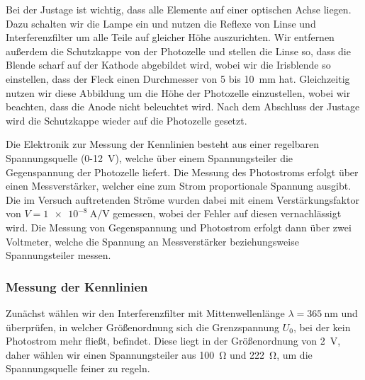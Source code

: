 \documentclass[11pt, a4paper]{article}
\numberwithin{equation}{section}
\begin{document}
Bei der Justage ist wichtig, dass alle Elemente auf einer optischen Achse liegen.
Dazu schalten wir die Lampe ein und nutzen die Reflexe von Linse und Interferenzfilter um alle Teile auf gleicher Höhe auszurichten.
Wir entfernen außerdem die Schutzkappe von der Photozelle und stellen die Linse so, dass die Blende scharf auf der Kathode abgebildet wird, wobei wir die Irisblende so einstellen, dass der Fleck einen Durchmesser von \num{5} bis \SI{10}{\milli\metre} hat.
Gleichzeitig nutzen wir diese Abbildung um die Höhe der Photozelle einzustellen, wobei wir beachten, dass die Anode nicht beleuchtet wird.
Nach dem Abschluss der Justage wird die Schutzkappe wieder auf die Photozelle gesetzt.

Die Elektronik zur Messung der Kennlinien besteht aus einer regelbaren Spannungsquelle (\num{0}-\SI{12}{\volt}), welche über einem Spannungsteiler die Gegenspannung der Photozelle liefert.
Die Messung des Photostroms erfolgt über einen Messverstärker, welcher eine zum Strom proportionale Spannung ausgibt.
Die im Versuch auftretenden Ströme wurden dabei mit einem Verstärkungsfaktor von $V = \SI{1e-8}{\ampere\per\volt}$ gemessen, wobei der Fehler auf diesen vernachlässigt wird.
Die Messung von Gegenspannung und Photostrom erfolgt dann über zwei Voltmeter, welche die Spannung an Messverstärker beziehungsweise Spannungsteiler messen.

\subsubsection{Messung der Kennlinien}
Zunächst wählen wir den Interferenzfilter mit Mittenwellenlänge $\lambda = \SI{365}{\nano\metre}$ und überprüfen, in welcher Größenordnung sich die Grenzspannung $U_0$, bei der kein Photostrom mehr fließt, befindet.
Diese liegt in der Größenordnung von \SI{2}{\volt}, daher wählen wir einen Spannungsteiler aus \SI{100}{\ohm} und \SI{222}{\ohm}, um die Spannungsquelle feiner zu regeln.
\end{document}
